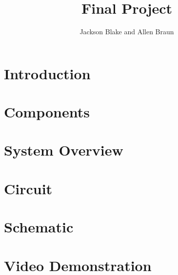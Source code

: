\documentclass{article}
\title{Final Project}
\author{Jackson Blake and Allen Braun}
\begin{document}
\maketitle
\section{Introduction}
\section{Components}
\section{System Overview}
\section{Circuit}
\section{Schematic}
\section{Video Demonstration}
\end{document}
